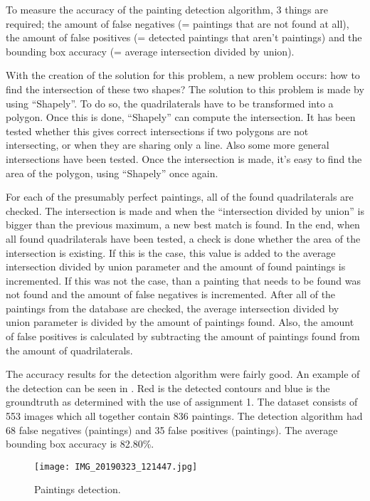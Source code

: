 To measure the accuracy of the painting detection algorithm, 3 things are required; the amount of false negatives (= paintings that are not found at all), the amount of false positives (= detected paintings that aren't paintings) and the bounding box accuracy (= average intersection divided by union).

With the creation of the solution for this problem, a new problem occurs: how to find the intersection of these two shapes? The solution to this problem is made by using ``Shapely''. To do so, the quadrilaterals have to be transformed into a polygon. Once this is done, ``Shapely'' can compute the intersection. It has been tested whether this gives correct intersections if two polygons are not intersecting, or when they are sharing only a line. Also some more general intersections have been tested. Once the intersection is made, it's easy to find the area of the polygon, using ``Shapely'' once again.

For each of the presumably perfect paintings, all of the found quadrilaterals are checked. The intersection is made and when the ``intersection divided by union'' is bigger than the previous maximum, a new best match is found. In the end, when all found quadrilaterals have been tested, a check is done whether the area of the intersection is existing. If this is the case, this value is added to the average intersection divided by union parameter and the amount of found paintings is incremented. If this was not the case, than a painting that needs to be found was not found and the amount of false negatives is incremented. After all of the paintings from the database are checked, the average intersection divided by union parameter is divided by the amount of paintings found. Also, the amount of false positives is calculated by subtracting the amount of paintings found from the amount of quadrilaterals.

The accuracy results for the detection algorithm were fairly good. An example of the detection can be seen in . Red is the detected contours and blue is the groundtruth as determined with the use of assignment 1. The dataset consists of 553 images which all together contain 836 paintings. The detection algorithm had 68 false negatives (paintings) and 35 false positives (paintings). The average bounding box accuracy is 82.80\%.

\begin{figure}[h]
    \texttt{[image: IMG\_20190323\_121447.jpg]}
    \caption{Paintings detection.}
    \label{fig:paiting_detection_with_ground_truth}
\end{figure}

